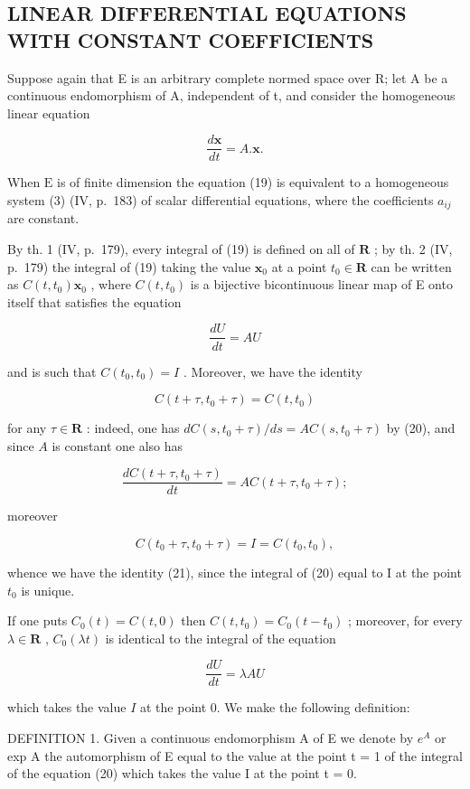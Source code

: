 \subsection{LINEAR DIFFERENTIAL EQUATIONS WITH CONSTANT COEFFICIENTS}

Suppose again that E is an arbitrary complete normed space over R; let A be a continuous endomorphism of A, independent of t, and consider the homogeneous linear equation

\[
{\frac {d \mathbf {x}}{d t}} = A. \mathbf {x}.\tag{19}
\]

When \(\mathrm{E}\) is of finite dimension the equation (19) is equivalent to a homogeneous system (3) (IV, p.~183) of scalar differential equations, where the coefficients \(a_{ij}\) are constant.

By th. 1 (IV, p.~179), every integral of (19) is defined on all of \(\mathbf{R}\) ; by th. 2 (IV, p.~179) the integral of (19) taking the value \(\mathbf{x}_0\) at a point \(t_0 \in \mathbf{R}\) can be written as \(C(t, t_0)\mathbf{x}_0\) , where \(C(t, t_0)\) is a bijective bicontinuous linear map of E onto itself that satisfies the equation

\[
\frac {d U}{d t} = A U\tag{20}
\]

and is such that \(C(t_0, t_0) = I\) . Moreover, we have the identity

\[
C (t + \tau , t _ {0} + \tau) = C (t, t _ {0})\tag{21}
\]

for any \(\tau \in \mathbf{R}\) : indeed, one has \(dC(s, t_0 + \tau) / ds = AC(s, t_0 + \tau)\) by (20), and since \(A\) is constant one also has

\[
\frac {d C (t + \tau , t _ {0} + \tau)}{d t} = A C (t + \tau , t _ {0} + \tau);
\]

moreover

\[
C (t _ {0} + \tau , t _ {0} + \tau) = I = C (t _ {0}, t _ {0}),
\]

whence we have the identity (21), since the integral of (20) equal to I at the point \(t_{0}\) is unique.

If one puts \(C_0(t) = C(t, 0)\) then \(C(t, t_0) = C_0(t - t_0)\) ; moreover, for every \(\lambda \in \mathbf{R}\) , \(C_0(\lambda t)\) is identical to the integral of the equation

\[
\frac {d U}{d t} = \lambda A U\tag{22}
\]

which takes the value \(I\) at the point 0. We make the following definition:

DEFINITION 1. Given a continuous endomorphism A of E we denote by \(e^{A}\) or exp A the automorphism of E equal to the value at the point t = 1 of the integral of the equation (20) which takes the value I at the point t = 0.

